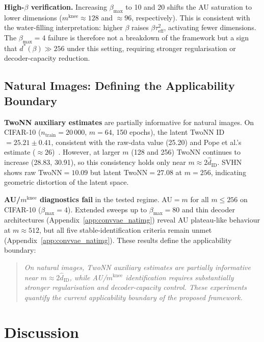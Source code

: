 \documentclass[11pt,a4paper]{article}
\newcommand{\mknee}{m^{\mathrm{knee}}}
\newcommand{\hatdID}{\hat{d}_{\mathrm{ID}}}
\begin{document}
\textbf{High-$\beta$ verification.}
Increasing $\beta_{\max}$ to 10 and 20 shifts the AU saturation to lower
dimensions ($\mknee\approx128$ and $\approx96$, respectively).
This is consistent with the water-filling interpretation: higher $\beta$ raises
$\beta\tau^2_{\mathrm{eff}}$, activating fewer dimensions.
The $\beta_{\max}=4$ failure is therefore not a breakdown of the framework but
a sign that $d^*(\beta)\gg256$ under this setting, requiring stronger
regularisation or decoder-capacity reduction.

\subsection{Natural Images: Defining the Applicability Boundary}\label{sec:exp_natural}

\textbf{TwoNN auxiliary estimates} are partially informative for natural images.
On CIFAR-10 ($n_{\mathrm{train}}=20\,000$, $m=64$, 150 epochs), the latent
TwoNN ID$=25.21\pm0.41$, consistent with the raw-data value (25.20) and Pope
et al.'s estimate ($\approx26$)~\cite{pope2021intrinsic}.
However, at larger $m$ (128 and 256) TwoNN continues to increase (28.83, 30.91),
so this consistency holds only near $m\approx2\hatdID$.
SVHN shows raw TwoNN$=10.09$ but latent TwoNN$=27.08$ at $m=256$, indicating
geometric distortion of the latent space.

\textbf{AU/$\mknee$ diagnostics fail} in the tested regime.
AU$=m$ for all $m\leq256$ on CIFAR-10 ($\beta_{\max}=4$).
Extended sweeps up to $\beta_{\max}=80$ and thin decoder architectures
(Appendix~\ref{app:convvae_natimg}) reveal AU plateau-like behaviour at
$m\approx512$, but all five stable-identification criteria remain unmet
(Appendix~\ref{app:convvae_natimg}).
These results define the applicability boundary:

\begin{quote}
\emph{On natural images, TwoNN auxiliary estimates are partially informative
near $m\approx2\hatdID$, while AU/$\mknee$ identification requires substantially
stronger regularisation and decoder-capacity control.
These experiments quantify the current applicability boundary of the proposed
framework.}
\end{quote}

\section{Discussion}\label{sec:discussion}
\end{document}
